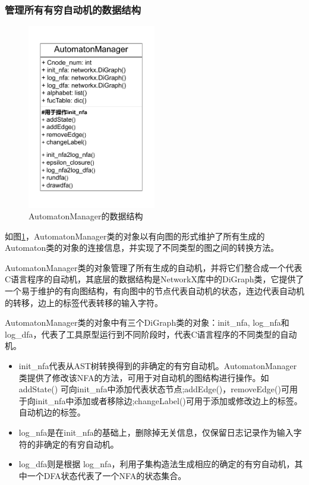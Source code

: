 \subsubsection{管理所有有穷自动机的数据结构}
\begin{figure}[htbp]
	\centering
	\includegraphics[width=0.5\textwidth]{pictures/AutomatonManager的数据结构.pdf}
	\caption{AutomatonManager的数据结构}
	\label{fig:AutomatonManager的数据结构}
\end{figure}
如图\ref{fig:AutomatonManager的数据结构}，AutomatonManager类的对象以有向图的形式维护了所有生成的Automaton类的对象的连接信息，并实现了不同类型的图之间的转换方法。

AutomatonManager类的对象管理了所有生成的自动机，并将它们整合成一个代表C语言程序的自动机，其底层的数据结构是NetworkX库\cite{networkx}中的DiGraph类，它提供了一个易于维护的有向图结构，有向图中的节点代表自动机的状态，连边代表自动机的转移，边上的标签代表转移的输入字符。

AutomatonManager类的对象中有三个DiGraph类的对象：init\_nfa, log\_nfa和 log\_dfa，代表了工具原型运行到不同阶段时，代表C语言程序的不同类型的自动机。
\begin{itemize}
    \item  init\_nfa代表从AST树转换得到的非确定的有穷自动机。AutomatonManager类提供了修改该NFA的方法，可用于对自动机的图结构进行操作。如 addState() 可向init\_nfa中添加代表状态节点;addEdge()，removeEdge()可用于向init\_nfa中添加或者移除边;changeLabel()可用于添加或修改边上的标签。
自动机边的标签。
    \item  log\_nfa是在init\_nfa的基础上，删除掉无关信息，仅保留日志记录作为输入字符的非确定的有穷自动机。
    \item  log\_dfa则是根据 log\_nfa，利用子集构造法生成相应的确定的有穷自动机，其中一个DFA状态代表了一个NFA的状态集合。
\end{itemize}

